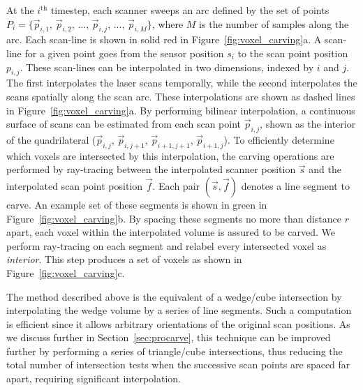 \documentclass[12pt,onecolumn,oneside]{book}
\begin{document}
At the $i^{\text{th}}$ timestep, each scanner sweeps an arc defined by the set of points $P_{i} = \{\vec{p}_{i,1},\,\vec{p}_{i,2},\,...,\,\vec{p}_{i,j},\,...,\,\vec{p}_{i,M}\}$, where $M$ is the number of samples along the arc.  Each scan-line is shown in solid red in Figure~\ref{fig:voxel_carving}a.  A scan-line for a given point goes from the sensor position $s_i$ to the scan point position $p_{i,j}$.  These scan-lines can be interpolated in two dimensions, indexed by $i$ and $j$.  The first interpolates the laser scans temporally, while the second interpolates the scans spatially along the scan arc.  These interpolations are shown as dashed lines in Figure~\ref{fig:voxel_carving}a.  By performing bilinear interpolation, a continuous surface of scans can be estimated from each scan point $\vec{p}_{i,j}$, shown as the interior of the quadrilateral ($\vec{p}_{i,j}$, $\vec{p}_{i,j+1}$, $\vec{p}_{i+1,j+1}$, $\vec{p}_{i+1,j}$).  To efficiently determine which voxels are intersected by this interpolation, the carving operations are performed by ray-tracing between the interpolated scanner position $\vec{s}$ and the interpolated scan point position $\vec{f}$.  Each pair $(\vec{s}, \vec{f})$ denotes a line segment to carve.  An example set of these segments is shown in green in Figure~\ref{fig:voxel_carving}b.  By spacing these segments no more than distance $r$ apart, each voxel within the interpolated volume is assured to be carved.  We perform ray-tracing on each segment and relabel every intersected voxel as {\it interior}.  This step produces a set of voxels as shown in Figure~\ref{fig:voxel_carving}c.

The method described above is the equivalent of a wedge/cube intersection by interpolating the wedge volume by a series of line segments.  Such a computation is efficient since it allows arbitrary orientations of the original scan positions.  As we discuss further in Section~\ref{sec:procarve}, this technique can be improved further by performing a series of triangle/cube intersections, thus reducing the total number of intersection tests when the successive scan points are spaced far apart, requiring significant interpolation.
\end{document}
